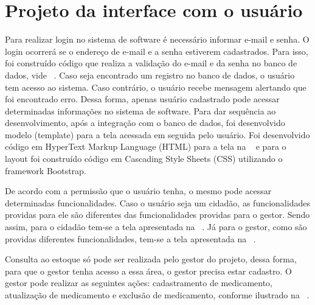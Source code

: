 %




\section{Projeto da interface com o usuário}


Para realizar login no sistema de software é necessário informar e-mail e senha. O login ocorrerá se o endereço de e-mail e a senha estiverem cadastrados. Para isso, foi construído código que realiza a validação do e-mail e da senha no banco de dados, vide ~. Caso seja encontrado um registro no banco de dados, o usuário tem acesso ao sistema. Caso contrário, o usuário recebe mensagem alertando que foi encontrado erro. Dessa forma, apenas usuário cadastrado pode acessar determinadas informações no sistema de software. Para dar sequência ao desenvolvimento, após a integração com o banco de dados, foi desenvolvido  modelo (template) para a tela acessada em seguida pelo usuário. Foi desenvolvido código em HyperText Markup Language (HTML) para a tela na ~ e para o layout foi construído código em Cascading Style Sheets (CSS) utilizando o framework Bootstrap. 

%

%

%

%

De acordo com a permissão que o usuário tenha, o mesmo pode acessar determinadas funcionalidades. Caso o usuário seja um cidadão, as funcionalidades providas para ele são diferentes das funcionalidades providas para o gestor. Sendo assim, para o cidadão tem-se a tela apresentada na ~. Já para o gestor, como são providas diferentes funcionalidades, tem-se a tela apresentada na ~.

%

Consulta ao estoque só pode ser realizada pelo gestor do projeto, dessa forma, para que o gestor tenha acesso a essa área, o gestor precisa estar cadastro. O gestor pode realizar as seguintes ações: cadastramento de medicamento, atualização de medicamento e exclusão de medicamento, conforme ilustrado na ~.



